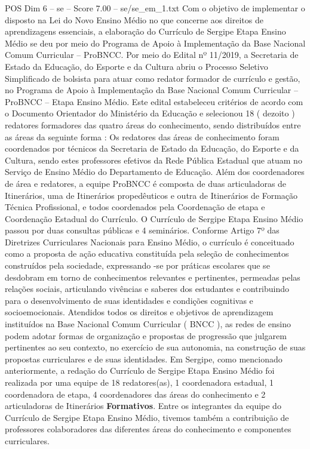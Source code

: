 \begin{textsample}{POS Dim 6 – se – Score 7.00 – se/se\_em\_1.txt}
Com o objetivo de implementar o disposto na Lei do Novo Ensino Médio no que concerne aos direitos de aprendizagens essenciais, a elaboração do Currículo de Sergipe Etapa Ensino Médio se deu por meio do Programa de Apoio à Implementação da Base Nacional Comum Curricular – ProBNCC.
Por meio do Edital nº 11/2019, a Secretaria de Estado da Educação, do Esporte e da Cultura abriu o Processo Seletivo Simplificado de bolsista para atuar como redator formador de currículo e gestão, no Programa de Apoio à Implementação da Base Nacional Comum Curricular – ProBNCC – Etapa Ensino Médio.
Este edital estabeleceu critérios de acordo com o Documento Orientador do Ministério da Educação e selecionou 18 ( dezoito ) redatores formadores das quatro áreas do conhecimento, sendo distribuídos entre as áreas da seguinte forma : Os redatores das áreas de conhecimento foram coordenados por técnicos da Secretaria de Estado da Educação, do Esporte e da Cultura, sendo estes professores efetivos da Rede Pública Estadual que atuam no Serviço de Ensino Médio do Departamento de Educação.
Além dos coordenadores de área e redatores, a equipe ProBNCC é composta de duas articuladoras de Itinerários, uma de Itinerários propedêuticos e outra de Itinerários de Formação Técnica Profissional, e todos coordenados pela Coordenação de etapa e Coordenação Estadual do Currículo.
O Currículo de Sergipe Etapa Ensino Médio passou por duas consultas públicas e 4 seminários.
Conforme Artigo 7º das Diretrizes Curriculares Nacionais para Ensino Médio, o currículo é conceituado como a proposta de ação educativa constituída pela seleção de conhecimentos construídos pela sociedade, expressando -se por práticas escolares que se desdobram em torno de conhecimentos relevantes e pertinentes, permeadas pelas relações sociais, articulando vivências e saberes dos estudantes e contribuindo para o desenvolvimento de suas identidades e condições cognitivas e socioemocionais.
Atendidos todos os direitos e objetivos de aprendizagem instituídos na Base Nacional Comum Curricular ( BNCC ), as redes de ensino podem adotar formas de organização e propostas de progressão que julgarem pertinentes ao seu contexto, no exercício de sua autonomia, na construção de suas propostas curriculares e de suas identidades.
Em Sergipe, como mencionado anteriormente, a redação do Currículo de Sergipe Etapa Ensino Médio foi realizada por uma equipe de 18 redatores(as), 1 coordenadora estadual, 1 coordenadora de etapa, 4 coordenadores das áreas do conhecimento e 2 articuladoras de Itinerários \textbf{Formativos}.
Entre os integrantes da equipe do Currículo de Sergipe Etapa Ensino Médio, tivemos também a contribuição de professores colaboradores das diferentes áreas do conhecimento e componentes curriculares.

\end{textsample}
